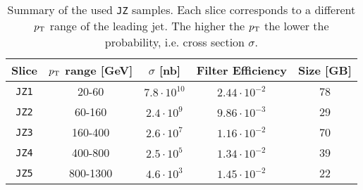 \begin{table}[!htb]
    \centering
    \caption{Summary of the used \texttt{JZ} samples. Each slice corresponds to a different $p_\text{T}$ range of the leading jet. The higher the $p_\text{T}$ the lower the probability, i.e. cross section $\sigma$.}
    \label{tab:jz}
    \begin{tabular}{ccccc}
    \toprule
        Slice & $p_\text{T}$ range [GeV] & $\sigma$ [nb] & Filter Efficiency & Size [GB] \\
    \midrule
        \texttt{JZ1} & 20-60 & $7.8\cdot10^{10}$ & $2.44\cdot10^{-2}$ & 78    \\
        \texttt{JZ2} & 60-160 & $2.4\cdot10^{9}$ & $9.86\cdot10^{-3}$ & 29    \\
        \texttt{JZ3} & 160-400 & $2.6\cdot10^{7}$ & $1.16\cdot10^{-2}$ & 70    \\
        \texttt{JZ4} & 400-800 & $2.5\cdot10^{5}$ & $1.34\cdot10^{-2}$ & 39    \\
        \texttt{JZ5} & 800-1300 & $4.6\cdot10^{3}$ & $1.45\cdot10^{-2}$ & 22    \\
    \bottomrule
    \end{tabular}
\end{table}
















